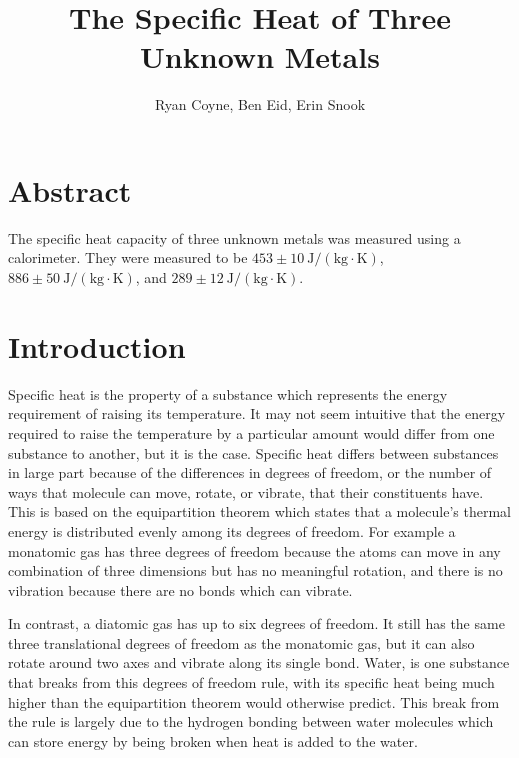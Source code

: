 \documentclass[12pt]{article}
\begin{document}
    \title{The Specific Heat of Three Unknown Metals}
    \author{Ryan Coyne, Ben Eid, Erin Snook}
    \maketitle

    \section{Abstract}
        The specific heat capacity of three unknown metals was measured using a calorimeter. They were measured to be \(453 \pm 10 ~\mathrm{J/(kg\cdot K)}\), \(886 \pm 50 ~\mathrm{J/(kg\cdot K)}\), and \(289 \pm 12 ~\mathrm{J/(kg\cdot K)}\).
    \section{Introduction}
        Specific heat is the property of a substance which represents the energy requirement of raising its temperature. It may not seem intuitive that the energy required to raise the temperature by a particular amount would differ from one substance to another, but it is the case. Specific heat differs between substances in large part because of the differences in degrees of freedom, or the number of ways that molecule can move, rotate, or vibrate, that their constituents have. This is based on the equipartition theorem which states that a molecule's thermal energy is distributed evenly among its degrees of freedom. For example a monatomic gas has three degrees of freedom because the atoms can move in any combination of three dimensions but has no meaningful rotation, and there is no vibration because there are no bonds which can vibrate. 

        In contrast, a diatomic gas has up to six degrees of freedom. It still has the same three translational degrees of freedom as the monatomic gas, but it can also rotate around two axes and vibrate along its single bond. Water, is one substance that breaks from this degrees of freedom rule, with its specific heat being much higher than the equipartition theorem would otherwise predict. This break from the rule is largely due to the hydrogen bonding between water molecules which can store energy by being broken when heat is added to the water. 
\end{document}

